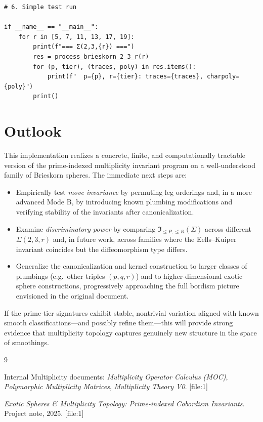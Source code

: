 \documentclass[11pt]{article}
\begin{document}
\begin{verbatim}
# 6. Simple test run

if __name__ == "__main__":
    for r in [5, 7, 11, 13, 17, 19]:
        print(f"=== Σ(2,3,{r}) ===")
        res = process_brieskorn_2_3_r(r)
        for (p, tier), (traces, poly) in res.items():
            print(f"  p={p}, r={tier}: traces={traces}, charpoly={poly}")
        print()
\end{verbatim}

\section{Outlook}

This implementation realizes a concrete, finite, and computationally tractable version of the prime-indexed multiplicity invariant program on a well-understood family of Brieskorn spheres.\cite{exotic-mult} The immediate next steps are:

\begin{itemize}[leftmargin=1.5em]
  \item Empirically test \emph{move invariance} by permuting leg orderings and, in a more advanced Mode B, by introducing known plumbing modifications and verifying stability of the invariants after canonicalization.
  \item Examine \emph{discriminatory power} by comparing $\mathfrak I_{\le P,\le R}(\Sigma)$ across different $\Sigma(2,3,r)$ and, in future work, across families where the Eells--Kuiper invariant coincides but the diffeomorphism type differs.
  \item Generalize the canonicalization and kernel construction to larger classes of plumbings (e.g.\ other triples $(p,q,r)$) and to higher-dimensional exotic sphere constructions, progressively approaching the full bordism picture envisioned in the original document.
\end{itemize}

If the prime-tier signatures exhibit stable, nontrivial variation aligned with known smooth classifications---and possibly refine them---this will provide strong evidence that multiplicity topology captures genuinely new structure in the space of smoothings.


\begin{thebibliography}{9}

Internal Multiplicity documents:
\emph{Multiplicity Operator Calculus (MOC)}, \emph{Polymorphic Multiplicity Matrices}, \emph{Multiplicity Theory V0}. [file:1]

\emph{Exotic Spheres \& Multiplicity Topology: Prime-indexed Cobordism Invariants}. Project note, 2025. [file:1]

\end{thebibliography}
\end{document}
